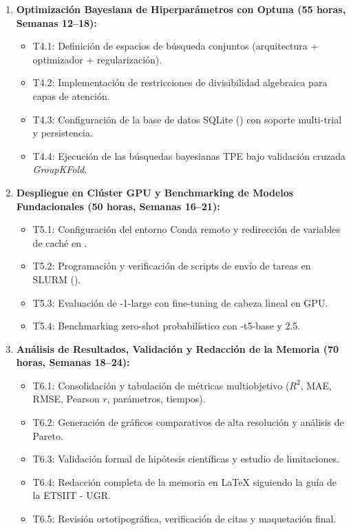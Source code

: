 \begin{enumerate}[label=\textbf{WP\arabic*.}, leftmargin=1.8cm]
\begin{itemize}
        \item T3.4: Construcción del motor desacoplado de entrenamiento y validación ().
        \item T3.5: Creación de la suite de pruebas unitarias con  y test de sanidad.
    \end{itemize}
    \item \textbf{Optimización Bayesiana de Hiperparámetros con Optuna (55 horas, Semanas 12--18):}
    \begin{itemize}
        \item T4.1: Definición de espacios de búsqueda conjuntos (arquitectura + optimizador + regularización).
        \item T4.2: Implementación de restricciones de divisibilidad algebraica para capas de atención.
        \item T4.3: Configuración de la base de datos SQLite () con soporte multi-trial y persistencia.
        \item T4.4: Ejecución de las búsquedas bayesianas TPE bajo validación cruzada \textit{GroupKFold}.
    \end{itemize}
    \item \textbf{Despliegue en Clúster GPU y Benchmarking de Modelos Fundacionales (50 horas, Semanas 16--21):}
    \begin{itemize}
        \item T5.1: Configuración del entorno Conda remoto y redirección de variables de caché en .
        \item T5.2: Programación y verificación de scripts de envío de tareas en SLURM ().
        \item T5.3: Evaluación de \moment{}-1-large con fine-tuning de cabeza lineal en GPU.
        \item T5.4: Benchmarking zero-shot probabilístico con \chronos{}-t5-base y \timesfm{} 2.5.
    \end{itemize}
    \item \textbf{Análisis de Resultados, Validación y Redacción de la Memoria (70 horas, Semanas 18--24):}
    \begin{itemize}
        \item T6.1: Consolidación y tabulación de métricas multiobjetivo ($R^2$, MAE, RMSE, Pearson $r$, parámetros, tiempos).
        \item T6.2: Generación de gráficos comparativos de alta resolución y análisis de Pareto.
        \item T6.3: Validación formal de hipótesis científicas y estudio de limitaciones.
        \item T6.4: Redacción completa de la memoria en LaTeX siguiendo la guía de la ETSIIT - UGR.
        \item T6.5: Revisión ortotipográfica, verificación de citas y maquetación final.
    \end{itemize}
\end{enumerate}

